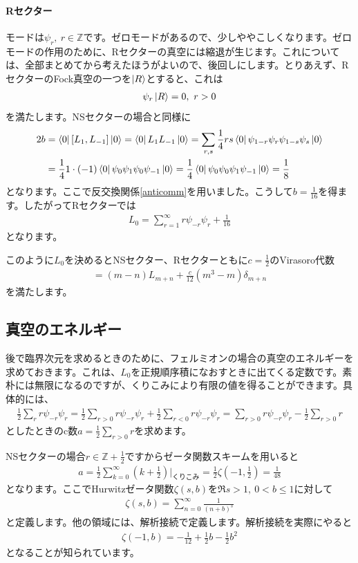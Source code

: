 \documentclass[report,paper=a4, fontsize=12pt, line_length=16cm, number_of_lines=33,dvipdfmx]{jlreq}
\numberwithin{equation}{chapter}
\numberwithin{equation}{section}
\newcommand{\Zb}{\mathbb{Z}}
\begin{document}
\paragraph{Rセクター}
モードは$\psi_{r},\ r\in \Zb$です。ゼロモードがあるので、少しややこしくなります。ゼロモードの作用のために、Rセクターの真空には縮退が生じます。これについては、全部まとめてから考えたほうがよいので、後回しにします。とりあえず、RセクターのFock真空の一つを$\ket{R}$とすると、これは
\begin{align}
  \psi_{r}\ket{R}=0,\ r>0
\end{align}
を満たします。NSセクターの場合と同様に
\begin{align}
  2b&=\bra{0}[L_{1},L_{-1}]\ket{0}
  =\bra{0}L_{1}L_{-1}\ket{0}
  =\sum_{r,s}\frac14rs\bra{0}\psi_{1-r}\psi_{r}\psi_{1-s}\psi_{s}\ket{0}\nonumber\\
  &
  =\frac14 1\cdot (-1)\bra{0}\psi_{0}\psi_{1}\psi_{0}\psi_{-1}\ket{0}
  =\frac14 \bra{0}\psi_{0}\psi_{0}\psi_{1}\psi_{-1}\ket{0}
  =\frac{1}{8}
\end{align}
となります。ここで反交換関係\eqref{anticomm}を用いました。こうして$b=\frac{1}{16}$を得ます。したがってRセクターでは
\begin{align}
  L_0=\sum_{r=1}^{\infty} r\psi_{-r}\psi_{r}
  +\frac{1}{16}
\end{align}
となります。

このように$L_0$を決めるとNSセクター、Rセクターともに$c=\frac12$のVirasoro代数
\begin{align}
  [L_m,L_n]=(m-n)L_{m+n}+\frac{c}{12}(m^3-m)\delta_{m+n}
\end{align}
を満たします。

\subsection{真空のエネルギー}
後で臨界次元を求めるときのために、フェルミオンの場合の真空のエネルギーを求めておきます。これは、$L_0$を正規順序積になおすときに出てくる定数です。素朴には無限になるのですが、くりこみにより有限の値を得ることができます。具体的には、
\begin{align}
  \frac12\sum_{r}r\psi_{-r}\psi_{r}
  =
  \frac 12 \sum_{r>0}r\psi_{-r}\psi_{r}
  +  \frac 12 \sum_{r<0}r\psi_{-r}\psi_{r}
  =\sum_{r>0}r\psi_{-r}\psi_{r}-\frac12 \sum_{r>0}r
\end{align}
としたときのc数$a=\frac12 \sum_{r>0}r$を求めます。

NSセクターの場合$r\in \Zb+\frac12$ですからゼータ関数スキームを用いると
\begin{align}
 a=\frac12 \sum_{k=0}^{\infty}(k+\frac12)\Bigg|_{\text{くりこみ}}=\frac12 \zeta(-1,\frac12)=
 \frac{1}{48}\label{aNSfermion1}
\end{align}
となります。ここでHurwitzゼータ関数$\zeta(s,b)$を$\Re s >1,\ 0< b \le 1$に対して
\begin{align}
  \zeta(s,b)=\sum_{n=0}^{\infty}\frac{1}{(n+b)^s}\label{zetafunction}
\end{align}
と定義します。他の領域には、解析接続で定義します。解析接続を実際にやると
\begin{align}
  \zeta(-1,b)=-\frac{1}{12}+\frac12 b -\frac12 b^2\label{zetavalue}
\end{align}
となることが知られています。
\end{document}

